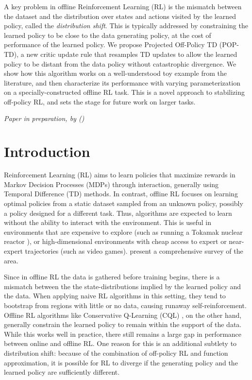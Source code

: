

A key problem in offline Reinforcement Learning (RL) is the mismatch between the dataset and the distribution over states and actions visited by the learned policy, called the \emph{distribution shift}. This is typically addressed by constraining the learned policy to be close to the data generating policy, at the cost of performance of the learned policy. We propose Projected Off-Policy TD (POP-TD), a new critic update rule that resamples TD updates to allow the learned policy to be distant from the data policy without catastrophic divergence. We show how this algorithm works on a well-understood toy example from the literature, and then characterize its performance with varying parameterization on a specially-constructed offline RL task. This is a novel approach to stabilizing off-policy RL, and sets the stage for future work on larger tasks.

\emph{Paper in preparation, by \citeauthor{manek2023poptd} (\citeyear{manek2023poptd})}

\clearpage


\section{Introduction}

Reinforcement Learning (RL) aims to learn policies that maximize rewards in Markov Decision Processes (MDPs) through interaction, generally using Temporal Difference (TD) methods. In contrast, offline RL focuses on learning optimal policies from a static dataset sampled from an unknown policy, possibly a policy designed for a different task. Thus, algorithms are expected to learn without the ability to interact with the environment.
This is useful in environments that are expensive to explore (such as running a Tokamak nuclear reactor \cite{degrave2022magnetic}), or high-dimensional environments with cheap access to expert or near-expert trajectories (such as video games). \citet{levine2020survey} present a comprehensive survey of the area.

Since in offline RL the data is gathered before training begins, there is a mismatch between the the state-distributions implied by the learned policy and the data.
When applying naive RL algorithms in this setting, they tend to bootstrap from regions with little or no data, causing runaway self-reinforcement.
Offline RL algorithms like Conservative Q-Learning (CQL) \cite{kumar2020cql}, on the other hand, generally constrain the learned policy to remain within the support of the data. While this works well in practice, there still remains a large gap in performance between online and offline RL. One reason for this is an additional subtlety to distribution shift: because of the combination of off-policy RL and function approximation, it is possible for RL to diverge if the generating policy and the learned policy are sufficiently different.

